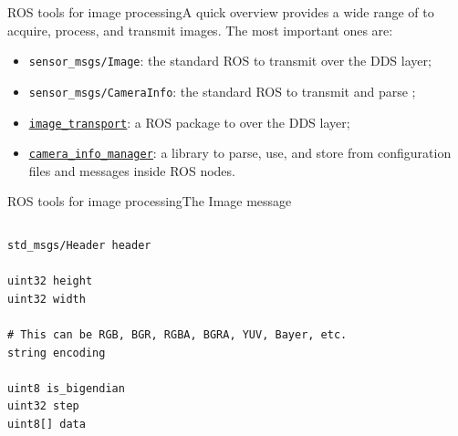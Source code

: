 \begin{frame}{ROS tools for image processing}{A quick overview}
	 provides a wide range of  to acquire, process, and transmit images. The most important ones are:
	\begin{itemize}
		\item \texttt{sensor\_msgs/Image}: the standard ROS  to transmit  over the DDS layer;
		\item \texttt{sensor\_msgs/CameraInfo}: the standard ROS  to transmit and parse ;
		\item \href{https://wiki.ros.org/image_transport}{\color{blue}\underline{\texttt{image\_transport}}}: a ROS package to  over the DDS layer;
		\item \href{https://wiki.ros.org/camera_info_manager}{\color{blue}\underline{\texttt{camera\_info\_manager}}}: a library to parse, use, and store  from configuration files and messages inside ROS nodes.
	\end{itemize}
\end{frame}
\begin{frame}[fragile]{ROS tools for image processing}{The Image message}
	\begin{columns}
		\begin{lstlisting}[language=ros2msg, caption=Definition of the \texttt{sensor\_msgs/msg/Image} message.]
std_msgs/Header header

uint32 height
uint32 width

# This can be RGB, BGR, RGBA, BGRA, YUV, Bayer, etc.
string encoding

uint8 is_bigendian
uint32 step
uint8[] data\end{lstlisting}
	\end{columns}
\end{frame}
